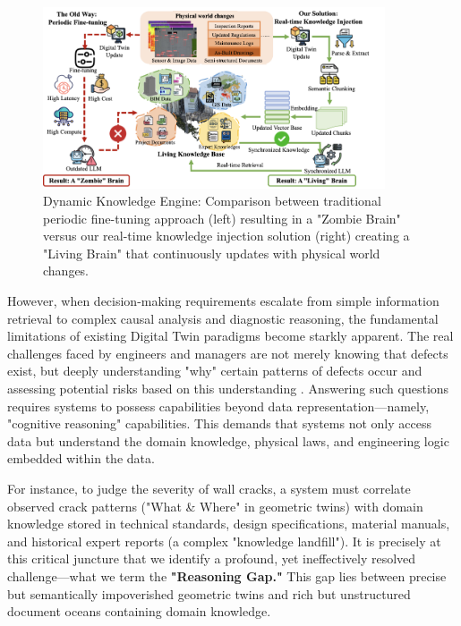 \begin{figure}[htbp]
\centering
\includegraphics[width=0.9\textwidth]{figures/DefectGPT/dynamic_knowledge_engine.png}
\caption{Dynamic Knowledge Engine: Comparison between traditional periodic fine-tuning approach (left) resulting in a "Zombie Brain" versus our real-time knowledge injection solution (right) creating a "Living Brain" that continuously updates with physical world changes.}
\label{fig:dynamic-knowledge-engine}
\end{figure}

However, when decision-making requirements escalate from simple information retrieval to complex causal analysis and diagnostic reasoning, the fundamental limitations of existing Digital Twin paradigms become starkly apparent. The real challenges faced by engineers and managers are not merely knowing that defects exist, but deeply understanding "why" certain patterns of defects occur and assessing potential risks based on this understanding \cite{hamdan2021semantic}. Answering such questions requires systems to possess capabilities beyond data representation—namely, "cognitive reasoning" capabilities. This demands that systems not only access data but understand the domain knowledge, physical laws, and engineering logic embedded within the data.

For instance, to judge the severity of wall cracks, a system must correlate observed crack patterns ("What \& Where" in geometric twins) with domain knowledge stored in technical standards, design specifications, material manuals, and historical expert reports (a complex "knowledge landfill"). It is precisely at this critical juncture that we identify a profound, yet ineffectively resolved challenge—what we term the \textbf{"Reasoning Gap."} This gap lies between precise but semantically impoverished geometric twins and rich but unstructured document oceans containing domain knowledge.

